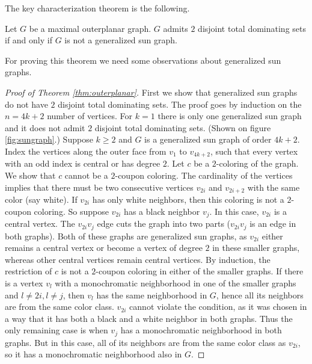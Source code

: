 The key characterization theorem is the following.

\begin{thm}\label{thm:outerplanar}
  Let $G$ be a maximal outerplanar graph. $G$ admits $2$ disjoint total dominating
  sets if and only if $G$ is not a generalized sun graph.
\end{thm}

For proving this theorem we need some observations about generalized sun graphs.

\begin{proof}[Proof of Theorem \ref{thm:outerplanar}]
  First we show that generalized sun graphs do not have $2$ disjoint total
  dominating sets. The proof goes by induction on the $n = 4k + 2$ number of vertices.
  For $k = 1$ there is only one generalized sun graph and it does not admit $2$
  disjoint total dominating sets. (Shown on figure \ref{fig:sungraph}.)
  Suppose $k \ge 2$ and $G$ is a generalized sun graph of order $4k + 2$. Index
  the vertices along the outer face from $v_1$ to $v_{4k + 2}$, such that every
  vertex with an odd index is central or has degree $2$. Let $c$ be a $2$-coloring of
  the graph. We show that $c$ cannot be a $2$-coupon coloring. The cardinality of the
  vertices implies that there must be two consecutive vertices $v_{2i}$ and $v_{2i + 2}$
  with the same color (say white). If $v_{2i}$ has only white neighbors, then this
  coloring is not a $2$-coupon coloring. So suppose $v_{2i}$ has a black neighbor
  $v_j$. In this case, $v_{2i}$ is a central vertex. The $v_{2i}v_j$ edge cuts the graph
  into two parts ($v_{2i}v_j$ is an edge in both graphs). Both of
  these graphs are generalized sun graphs, as $v_{2i}$ either remains a central
  vertex or become a vertex of degree $2$ in these smaller graphs, whereas other
  central vertices remain central vertices. By induction, the restriction of
  $c$ is not a $2$-coupon coloring in either of the smaller graphs. If there is
  a vertex $v_l$ with a monochromatic neighborhood in one of the smaller graphs
  and $l \neq 2i, l \neq j$, then $v_l$ has the same neighborhood in $G$, hence
  all its neighbors are from the same color class. $v_{2i}$ cannot violate the
  condition, as it was chosen in a way that it has both a black and a white neighbor
  in both graphs. Thus the only remaining case is when $v_j$ has a monochromatic
  neighborhood in both graphs. But in this case, all of its neighbors are from
  the same color class as $v_{2i}$, so it has a monochromatic neighborhood also
  in $G$.
\end{proof}

